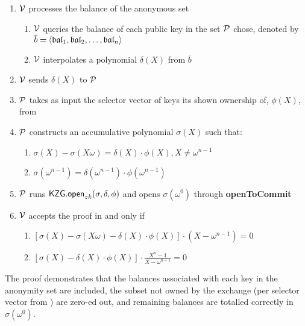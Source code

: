 

\begin{Protocol*}[t!]
\begin{framed}
\footnotesize


\begin{enumerate}
	\item $\mathcal{V}$ processes the balance of the anonymous set
	\begin{enumerate}
		\item $\mathcal{V}$ queries the balance of each public key in the set $\mathcal{P}$ chose, denoted by $\overline{b}=\left \langle \mathfrak{bal}_1,\mathfrak{bal}_2,\dots,\mathfrak{bal}_n \right \rangle$
		\item $\mathcal{V}$ interpolates a polynomial $\delta(X)$ from $\overline{b}$
	\end{enumerate}
	\item $\mathcal{V}$ sends $\delta(X)$ to $\mathcal{P}$
	\item $\mathcal{P}$ takes as input the selector vector of keys its shown ownership of, $\phi(X)$, from \bootstrap 
	\item $\mathcal{P}$ constructs an accumulative polynomial $\sigma(X)$ such that:
		\begin{enumerate}
	\item $\sigma(X)-\sigma(X\omega)=\delta(X)\cdot\phi(X),X\ne{\omega^{n-1}}$
	\item $\sigma(\omega^{n-1})=\delta(\omega^{n-1})\cdot\phi(\omega^{n-1})$
		\end{enumerate}
	\item $\mathcal{P}$ runs $\mathsf{KZG.open}_{zk}(\sigma,\delta,\phi)$ and opens $\sigma(\omega^0)$ through \textbf{openToCommit}
	\item $\mathcal{V}$ accepts the proof in and only if
	\begin{enumerate}
		\item $[\sigma(X)-\sigma(X\omega)-\delta(X)\cdot{\phi(X)}]\cdot(X-\omega^{n-1})=0$
		\item $[\sigma(X)-\delta(X)\cdot{\phi(X)}]\cdot\frac{X^n-1}{X-\omega^{n-1}}=0$
	\end{enumerate}
\end{enumerate}	


\normalsize	
\end{framed}
\caption{The \poa proof demonstrates that the balances associated with each key in the anonymity set are included, the subset not owned by the exchange (per selector vector from \bootstrap) are zero-ed out, and remaining balances are totalled correctly in $\sigma(\omega^0)$. \label{alg:poa}}
\end{Protocol*}
